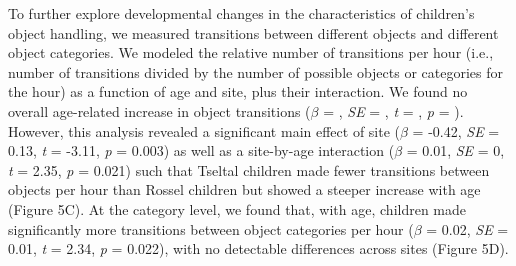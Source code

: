 \documentclass[10pt, letterpaper]{article}
\begin{document}
To further explore developmental changes in the characteristics of
children's object handling, we measured transitions between different
objects and different object categories. We modeled the relative number
of transitions per hour (i.e., number of transitions divided by the
number of possible objects or categories for the hour) as a function of
age and site, plus their interaction. We found no overall age-related
increase in object transitions (\(\beta\) = , \emph{SE} = , \emph{t} = ,
\emph{p} = ). However, this analysis revealed a significant main effect
of site (\(\beta\) = -0.42, \emph{SE} = 0.13, \emph{t} = -3.11, \emph{p}
= 0.003) as well as a site-by-age interaction (\(\beta\) = 0.01,
\emph{SE} = 0, \emph{t} = 2.35, \emph{p} = 0.021) such that Tseltal
children made fewer transitions between objects per hour than Rossel
children but showed a steeper increase with age (Figure 5C). At the
category level, we found that, with age, children made significantly
more transitions between object categories per hour (\(\beta\) = 0.02,
\emph{SE} = 0.01, \emph{t} = 2.34, \emph{p} = 0.022), with no detectable
differences across sites (Figure 5D).
\end{document}
